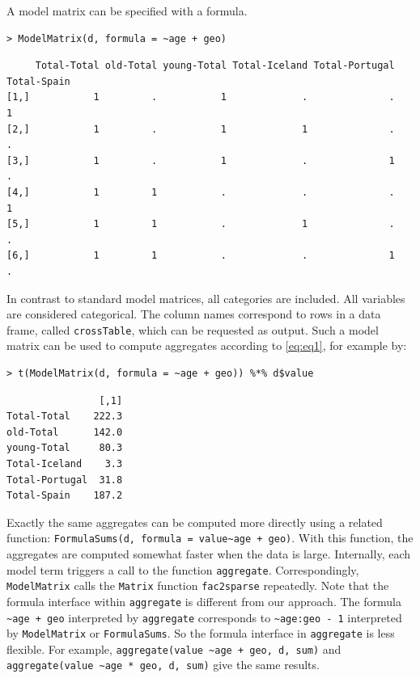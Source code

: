 A model matrix can be specified with a formula.

\begin{verbatim}
> ModelMatrix(d, formula = ~age + geo)
\end{verbatim}

\begin{verbatim}
     Total-Total old-Total young-Total Total-Iceland Total-Portugal Total-Spain
[1,]           1         .           1             .              .           1
[2,]           1         .           1             1              .           .
[3,]           1         .           1             .              1           .
[4,]           1         1           .             .              .           1
[5,]           1         1           .             1              .           .
[6,]           1         1           .             .              1           .
\end{verbatim}

In contrast to standard model matrices, all categories are included.
All variables are considered categorical.
The column names correspond to rows in a data frame, called \texttt{crossTable}, which can be requested as output.
Such a model matrix can be used to compute aggregates according to \eqref{eq:eq1}, for example by:

\begin{verbatim}
> t(ModelMatrix(d, formula = ~age + geo)) %*% d$value
\end{verbatim}

\begin{verbatim}
                [,1]
Total-Total    222.3
old-Total      142.0
young-Total     80.3
Total-Iceland    3.3
Total-Portugal  31.8
Total-Spain    187.2
\end{verbatim}

Exactly the same aggregates can be computed more directly using
a related  function: \texttt{FormulaSums(d,\ formula\ =\ value\textasciitilde{}age\ +\ geo)}.
With this function, the aggregates are computed somewhat faster when the data is large.
Internally, each model term triggers a call to the function \texttt{aggregate}.
Correspondingly, \texttt{ModelMatrix} calls the \texttt{Matrix} function \texttt{fac2sparse} repeatedly.
Note that the formula interface within \texttt{aggregate} is different from our approach.
The formula \texttt{\textasciitilde{}age\ +\ geo} interpreted by \texttt{aggregate} corresponds to \texttt{\textasciitilde{}age:geo\ -\ 1} interpreted by \texttt{ModelMatrix} or \texttt{FormulaSums}.
So the formula interface in \texttt{aggregate} is less flexible.
For example,
\texttt{aggregate(value\ \textasciitilde{}age\ +\ geo,\ d,\ sum)} and
\texttt{aggregate(value\ \textasciitilde{}age\ *\ geo,\ d,\ sum)} give the same results.

